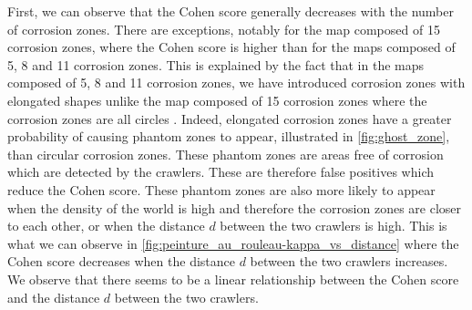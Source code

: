 First, we can observe that the Cohen score generally decreases with the number of corrosion zones.
There are exceptions, notably for the map composed of 15 corrosion zones, where the Cohen score is higher than for the maps composed of 5, 8 and 11 corrosion zones.
This is explained by the fact that in the maps composed of 5, 8 and 11 corrosion zones, we have introduced corrosion zones with elongated shapes unlike the map composed of 15 corrosion zones where the corrosion zones are all circles .
Indeed, elongated corrosion zones have a greater probability of causing phantom zones to appear, illustrated in \ref{fig:ghost_zone}, than circular corrosion zones.
These phantom zones are areas free of corrosion which are detected by the crawlers.
These are therefore false positives which reduce the Cohen score.
These phantom zones are also more likely to appear when the density of the world is high and therefore the corrosion zones are closer to each other, or when the distance $d$ between the two crawlers is high.
This is what we can observe in \ref{fig:peinture_au_rouleau-kappa_vs_distance} where the Cohen score decreases when the distance $d$ between the two crawlers increases.
We observe that there seems to be a linear relationship between the Cohen score and the distance $d$ between the two crawlers.

